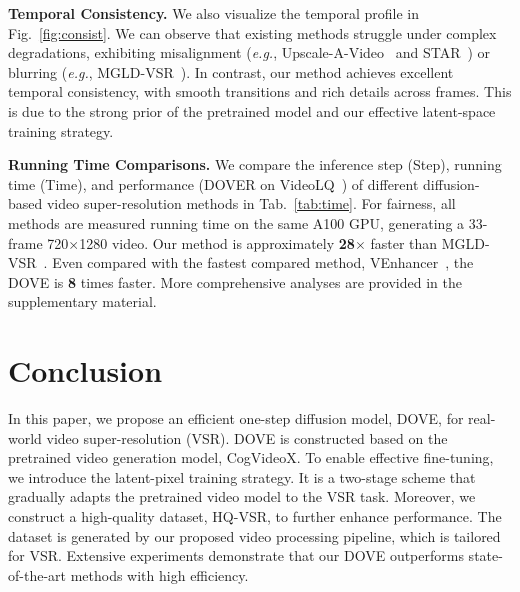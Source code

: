 \documentclass{article}
\newcommand\eg{\textit{e.g.}}
\begin{document}
\noindent \textbf{Temporal Consistency.}
 We also visualize the temporal profile in Fig.~\ref{fig:consist}. We can observe that existing methods struggle under complex degradations, exhibiting misalignment (\eg, Upscale-A-Video~\cite{zhou2024upscale} and STAR~\cite{xie2025star}) or blurring (\eg, MGLD-VSR~\cite{yang2024motion}). In contrast, our method achieves excellent temporal consistency, with smooth transitions and rich details across frames. This is due to the strong prior of the pretrained model and our effective latent-space training strategy.

\noindent \textbf{Running Time Comparisons.}
We compare the inference step (Step), running time (Time), and performance (DOVER on VideoLQ~\cite{chan2022investigating}) of different diffusion-based video super-resolution methods in Tab.~\ref{tab:time}. For fairness, all methods are measured running time on the same A100 GPU, generating a 33-frame 720$\times$1280 video. Our method is approximately \textbf{28$\times$} faster than MGLD-VSR~\cite{yang2024motion}. Even compared with the fastest compared method, VEnhancer~\cite{he2024venhancer}, the DOVE is \textbf{8} times faster.
More comprehensive analyses are provided in the supplementary material.

\vspace{-3.mm}
\section{Conclusion}
\vspace{-3.mm}
In this paper, we propose an efficient one-step diffusion model, DOVE, for real-world video super-resolution (VSR). DOVE is constructed based on the pretrained video generation model, CogVideoX. To enable effective fine-tuning, we introduce the latent-pixel training strategy. It is a two-stage scheme that gradually adapts the pretrained video model to the VSR task. Moreover, we construct a high-quality dataset, HQ-VSR, to further enhance performance. The dataset is generated by our proposed video processing pipeline, which is tailored for VSR. Extensive experiments demonstrate that our DOVE outperforms state-of-the-art methods with high efficiency.



{\small


}
\end{document}

